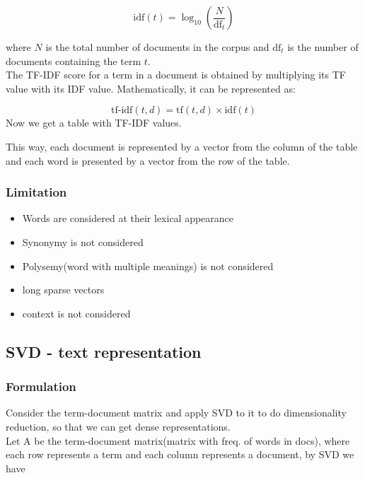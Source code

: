 \documentclass[12pt]{article}
\begin{document}
            \[
            \text{idf}(t) = \log_{10} \left( \frac{N}{\text{df}_{t}}\right)
            \]
            
            where $N$ is the total number of documents in the corpus and $\text{df}_{t}$ is the number of documents containing the term $t$.
            \\
            The TF-IDF score for a term in a document is obtained by multiplying its TF value with its IDF value. Mathematically, it can be represented as:

            \[
            \text{tf-idf}(t, d) = \text{tf}(t, d) \times \text{idf}(t)
            \]
            Now we get a table with TF-IDF values.
            
            This way, each document is represented by a vector from the column
            of the table and each word is presented by a vector from
            the row of the table.

            \subsubsection{Limitation}
            \begin{itemize}
                \item Words are considered at their lexical appearance
                \item Synonymy is not considered
                \item Polysemy(word with multiple meanings) is not considered
                \item long sparse vectors
                \item context is not considered
            \end{itemize}

    \subsection{SVD - text representation}
        \subsubsection{Formulation}
            Consider the term-document matrix and apply SVD to it
            to do dimensionality reduction, so that we can get dense
            representations.
            \\
            Let A be the term-document matrix(matrix with freq. of words in docs), 
            where each row represents a term and each column represents a document, 
            by SVD we have
\end{document}
